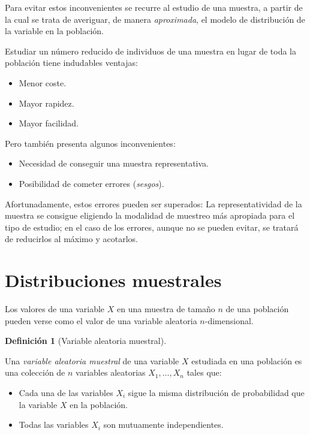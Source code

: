 \documentclass[
  a4paper,
]{scrreport}
\providecommand{\tightlist}{%
  \setlength{\itemsep}{0pt}\setlength{\parskip}{0pt}}\usepackage{longtable,booktabs,array}
\theoremstyle{definition}
\newtheorem{definition}{Definición}[chapter]
\theoremstyle{definition}
\theoremstyle{plain}
\theoremstyle{remark}
\begin{document}
Para evitar estos inconvenientes se recurre al estudio de una muestra, a
partir de la cual se trata de averiguar, de manera \emph{aproximada}, el
modelo de distribución de la variable en la población.

Estudiar un número reducido de individuos de una muestra en lugar de
toda la población tiene indudables ventajas:

\begin{itemize}
\tightlist
\item
  Menor coste.
\item
  Mayor rapidez.
\item
  Mayor facilidad.
\end{itemize}

Pero también presenta algunos inconvenientes:

\begin{itemize}
\tightlist
\item
  Necesidad de conseguir una muestra representativa.
\item
  Posibilidad de cometer errores (\emph{sesgos}).
\end{itemize}

Afortunadamente, estos errores pueden ser superados: La
representatividad de la muestra se consigue eligiendo la modalidad de
muestreo más apropiada para el tipo de estudio; en el caso de los
errores, aunque no se pueden evitar, se tratará de reducirlos al máximo
y acotarlos.

\hypertarget{distribuciones-muestrales}{%
\section{Distribuciones muestrales}\label{distribuciones-muestrales}}

Los valores de una variable \(X\) en una muestra de tamaño \(n\) de una
población pueden verse como el valor de una variable aleatoria
\(n\)-dimensional.

\begin{definition}[Variable aleatoria
muestral]\protect\hypertarget{def-variable-aleatoria-muestral}{}\label{def-variable-aleatoria-muestral}

Una \emph{variable aleatoria muestral} de una variable \(X\) estudiada
en una población es una colección de \(n\) variables aleatorias
\(X_1,\ldots,X_n\) tales que:

\begin{itemize}
\tightlist
\item
  Cada una de las variables \(X_i\) sigue la misma distribución de
  probabilidad que la variable \(X\) en la población.
\item
  Todas las variables \(X_i\) son mutuamente independientes.
\end{itemize}

\end{definition}
\end{document}

